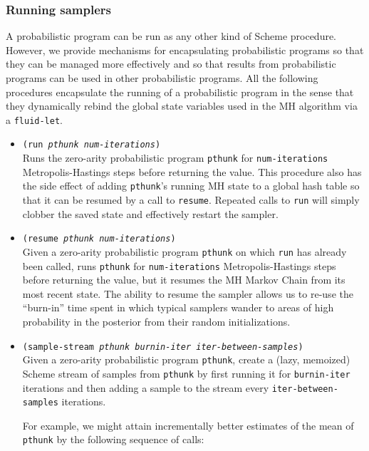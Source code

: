 \documentclass{article}
\begin{document}
\subsubsection{Running samplers}
A probabilistic program can be run as any other kind of Scheme procedure.
However, we provide mechanisms for encapsulating probabilistic programs so that
they can be managed more effectively and so that results from probabilistic
programs can be used in other probabilistic programs. All the following
procedures encapsulate the running of a probabilistic program in the sense that
they dynamically rebind the global state variables used in the MH algorithm via
a \texttt{fluid-let}.

\begin{itemize}
    \item[] \texttt{(run \emph{pthunk} \emph{num-iterations})}\\
        Runs the zero-arity probabilistic program \texttt{pthunk} for
        \texttt{num-iterations} Metropolis-Hastings steps before returning the
        value. This procedure also has the side effect of adding
        \texttt{pthunk}'s running MH state to a global hash table so that it
        can be resumed by a call to \texttt{resume}. Repeated calls to
        \texttt{run} will simply clobber the saved state and effectively
        restart the sampler.
    \item[] \texttt{(resume \emph{pthunk} \emph{num-iterations})}\\
        Given a zero-arity probabilistic program \texttt{pthunk} on which
        \texttt{run} has already been called, runs \texttt{pthunk} for
        \texttt{num-iterations} Metropolis-Hastings steps before returning the
        value, but it resumes the MH Markov Chain from its most recent state.
        The ability to resume the sampler allows us to re-use the ``burn-in''
        time spent in which typical samplers wander to areas of high
        probability in the posterior from their random initializations.
    \item[] \texttt{(sample-stream \emph{pthunk} \emph{burnin-iter} \emph{iter-between-samples})}\\
        Given a zero-arity probabilistic program \texttt{pthunk}, create a
        (lazy, memoized) Scheme stream of samples from \texttt{pthunk} by first
        running it for \texttt{burnin-iter} iterations and then adding a sample
        to the stream every \texttt{iter-between-samples} iterations.

        For example, we might attain incrementally better estimates of the mean
        of \texttt{pthunk} by the following sequence of calls:


\end{itemize}
\end{document}
